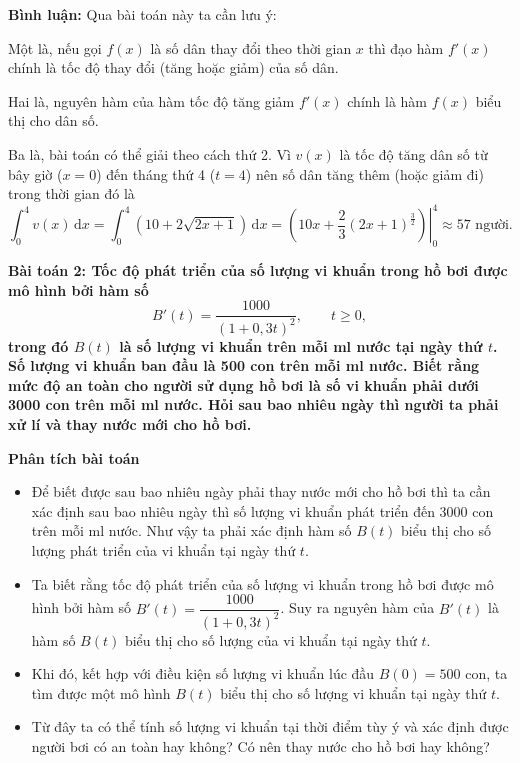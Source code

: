 \documentclass[12pt,a4paper]{article}
\newcommand{\dd}{\,\mathrm{d}}
\newcommand{\analysis}{\noindent\raisebox{0.15ex}{\rule{1.6ex}{1.6ex}}\hspace{4pt}\textbf{Phân tích bài toán}\par}
\newcommand{\commenthead}{\textbf{Bình luận:} Qua bài toán này ta cần lưu ý:\par}
\begin{document}
\begin{commentbox}\commenthead
Một là, nếu gọi $f(x)$ là số dân thay đổi theo thời gian $x$ thì đạo hàm $f'(x)$ chính là tốc độ
thay đổi (tăng hoặc giảm) của số dân.

Hai là, nguyên hàm của hàm tốc độ tăng giảm $f'(x)$ chính là hàm $f(x)$ biểu thị cho dân số.

Ba là, bài toán có thể giải theo cách thứ 2. Vì $v(x)$ là tốc độ tăng dân số từ bây giờ ($x=0$) đến tháng thứ 4 ($t=4$) nên số dân tăng thêm (hoặc giảm đi) trong thời gian đó là
\[
\int_0^4v(x)\dd x
=\int_0^4\left(10+2\sqrt{2x+1}\right)\dd x
=\left.\left(10x+\frac{2}{3}(2x+1)^{\frac{3}{2}}\right)\right|_0^4\approx57\text{ người}.
\]

\end{commentbox}\textbf{Bài toán 2: Tốc độ phát triển của số lượng vi khuẩn trong hồ bơi được mô hình bởi hàm số \[ B'(t)=\frac{1000}{(1+0,3t)^2},\qquad t\ge0, \] trong đó $B(t)$ là số lượng vi khuẩn trên mỗi ml nước tại ngày thứ $t$. Số lượng vi khuẩn ban đầu là 500 con trên mỗi ml nước. Biết rằng mức độ an toàn cho người sử dụng hồ bơi là số vi khuẩn phải dưới 3000 con trên mỗi ml nước. Hỏi sau bao nhiêu ngày thì người ta phải xử lí và thay nước mới cho hồ bơi.}\par\medskip
\begin{analysisbox}
\analysis
\begin{itemize}
\item Để biết được sau bao nhiêu ngày phải thay nước mới cho hồ bơi thì ta cần xác định sau bao nhiêu ngày thì số lượng vi khuẩn phát triển đến 3000 con trên mỗi ml nước. Như vậy ta phải xác định hàm số $B(t)$ biểu thị cho số lượng phát triển của vi khuẩn tại ngày thứ $t$.
\item Ta biết rằng tốc độ phát triển của số lượng vi khuẩn trong hồ bơi được mô hình bởi hàm số $B'(t)=\dfrac{1000}{(1+0,3t)^2}$. Suy ra nguyên hàm của $B'(t)$ là hàm số $B(t)$ biểu thị cho số lượng của vi khuẩn tại ngày thứ $t$.
\item Khi đó, kết hợp với điều kiện số lượng vi khuẩn lúc đầu $B(0)=500$ con, ta tìm được một mô hình $B(t)$ biểu thị cho số lượng vi khuẩn tại ngày thứ $t$.
\item Từ đây ta có thể tính số lượng vi khuẩn tại thời điểm tùy ý và xác định được người bơi có an toàn hay không? Có nên thay nước cho hồ bơi hay không?
\end{itemize}
\end{analysisbox}
\end{document}
